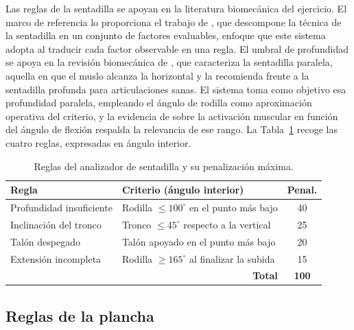\documentclass[12pt,a4paper,twoside,openright]{book}
\begin{document}
    Las reglas de la sentadilla se apoyan en la literatura biomecánica del
    ejercicio. El marco de referencia lo proporciona el trabajo de
    \textcite{myer2014}, que descompone la técnica de la sentadilla en un
    conjunto de factores evaluables, enfoque que este sistema adopta al traducir
    cada factor observable en una regla. El umbral de profundidad se apoya en la
    revisión biomecánica de \textcite{escamilla2001}, que caracteriza la
    sentadilla paralela, aquella en que el muslo alcanza la horizontal y la
    recomienda frente a la sentadilla profunda para articulaciones sanas. El
    sistema toma como objetivo esa profundidad paralela, empleando el ángulo de
    rodilla como aproximación operativa del criterio, y la evidencia de
    \textcite{han2017} sobre la activación muscular en función del ángulo de
    flexión respalda la relevancia de ese rango. La Tabla~\ref{tab:reglas-sentadilla}
    recoge las cuatro reglas, expresadas en ángulo interior.

    \begin{table}[htbp]
        \centering
        \small
        \begin{tabular}{p{4.6cm} p{5.2cm} c}
            \toprule
            \textbf{Regla} & \textbf{Criterio (ángulo interior)} & \textbf{Penal.} \\
            \midrule
            Profundidad insuficiente & Rodilla $\le 100^\circ$ en el punto más bajo & 40 \\
            Inclinación del tronco   & Tronco $\le 45^\circ$ respecto a la vertical  & 25 \\
            Talón despegado          & Talón apoyado en el punto más bajo            & 20 \\
            Extensión incompleta     & Rodilla $\ge 165^\circ$ al finalizar la subida & 15 \\
            \midrule
            \multicolumn{2}{r}{\textbf{Total}} & \textbf{100} \\
            \bottomrule
        \end{tabular}
        \caption{Reglas del analizador de sentadilla y su penalización máxima.}
        \label{tab:reglas-sentadilla}
    \end{table}

    \subsection{Reglas de la plancha}
\end{document}
